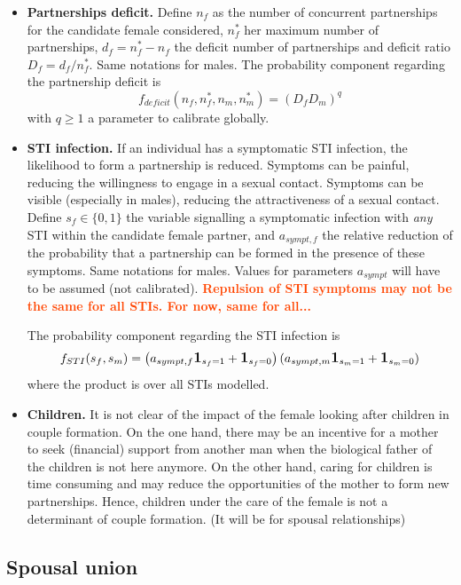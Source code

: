 \documentclass[11pt, onecolumn]{article}
\newcommand{\one}[1]{\textbf{\large{1}}_{#1}}
\newcommand{\warning}[1]{\textbf{\textcolor{OrangeRed}{#1}}}
\begin{document}
\begin{itemize}
\item \textbf{Partnerships deficit.} Define $n_f$ as the number of concurrent partnerships for the candidate female considered, $n^*_f$ her maximum number of partnerships, $d_f=n^*_f-n_f$ the deficit number of partnerships and deficit ratio $D_f=d_f/n^*_f$. Same notations for males. The probability component regarding the partnership deficit is
$$ f_{deficit}(n_f,n^*_f,n_m,n^*_m) = (D_f D_m)^q$$
with $q\geq 1$ a parameter to calibrate globally.

\item \textbf{STI infection.} If an individual has a symptomatic STI infection, the likelihood to form a partnership is reduced. Symptoms can be painful, reducing the willingness to engage in a sexual contact. Symptoms can be visible (especially in males), reducing the attractiveness of a sexual contact. Define $s_f\in\{0,1\}$ the variable signalling a symptomatic infection with \emph{any} STI within the candidate female partner, and $a_{sympt,f}$ the relative reduction of the probability that a partnership can be formed in the presence of these symptoms. Same notations for males. Values for parameters $a_{sympt}$ will have to be assumed (not calibrated). \warning{Repulsion of STI symptoms may not be the same for all STIs. For now, same for all...}

The probability component regarding the STI infection is
$$ f_{STI}(s_f,s_m)= \left(a_{sympt,f} \one{s_f=1} +\one{s_f=0}\right) \left(a_{sympt,m} \one{s_m=1} +\one{s_m=0}\right)$$
where the product is over all STIs modelled.


\item \textbf{Children.} It is not clear of the impact of the female looking after children in couple formation. On the one hand, there may be an incentive for a mother to seek (financial) support from another man when the biological father of the children is not here anymore. On the other hand, caring for children is time consuming and may reduce the opportunities of the mother to form new partnerships. Hence, children under the care of the female is not a determinant of couple formation. (It will be for spousal relationships)

\end{itemize}




\subsection{Spousal union}
\end{document}
